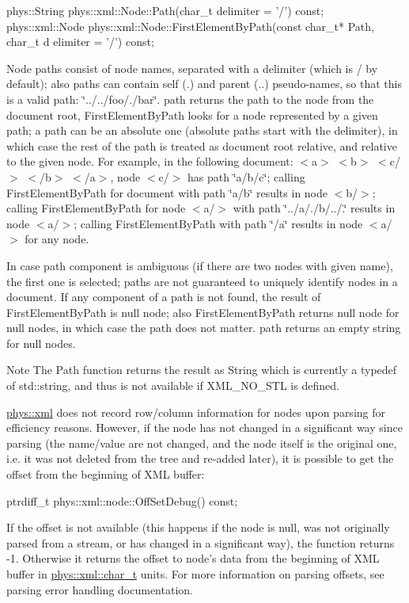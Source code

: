 \begin{DoxyCode}
 phys::String phys::xml::Node::Path(char_t delimiter = '/') const;
 phys::xml::Node phys::xml::Node::FirstElementByPath(const char_t* Path, char_t d
      elimiter = '/') const;
\end{DoxyCode}
 Node paths consist of node names, separated with a delimiter (which is / by default); also paths can contain self (.) and parent (..) pseudo-\/names, so that this is a valid path: \char`\"{}../../foo/./bar\char`\"{}. path returns the path to the node from the document root, FirstElementByPath looks for a node represented by a given path; a path can be an absolute one (absolute paths start with the delimiter), in which case the rest of the path is treated as document root relative, and relative to the given node. For example, in the following document: $<$a$>$ $<$b$>$ $<$c/$>$ $<$/b$>$ $<$/a$>$, node $<$c/$>$ has path \char`\"{}a/b/c\char`\"{}; calling FirstElementByPath for document with path \char`\"{}a/b\char`\"{} results in node $<$b/$>$; calling FirstElementByPath for node $<$a/$>$ with path \char`\"{}../a/./b/../.\char`\"{} results in node $<$a/$>$; calling FirstElementByPath with path \char`\"{}/a\char`\"{} results in node $<$a/$>$ for any node. \par
 \par
 In case path component is ambiguous (if there are two nodes with given name), the first one is selected; paths are not guaranteed to uniquely identify nodes in a document. If any component of a path is not found, the result of FirstElementByPath is null node; also FirstElementByPath returns null node for null nodes, in which case the path does not matter. path returns an empty string for null nodes. \begin{DoxyNote}{Note}
The Path function returns the result as String which is currently a typedef of std::string, and thus is not available if XML\_\-NO\_\-STL is defined.
\end{DoxyNote}
\hyperlink{namespacephys_1_1xml}{phys::xml} does not record row/column information for nodes upon parsing for efficiency reasons. However, if the node has not changed in a significant way since parsing (the name/value are not changed, and the node itself is the original one, i.e. it was not deleted from the tree and re-\/added later), it is possible to get the offset from the beginning of XML buffer: 
\begin{DoxyCode}
 ptrdiff_t phys::xml::node::OffSetDebug() const;
\end{DoxyCode}
 If the offset is not available (this happens if the node is null, was not originally parsed from a stream, or has changed in a significant way), the function returns -\/1. Otherwise it returns the offset to node's data from the beginning of XML buffer in \hyperlink{namespacephys_1_1xml_afc87705cd1c2917d87b879715a2d8f6e}{phys::xml::char\_\-t} units. For more information on parsing offsets, see parsing error handling documentation. \par

